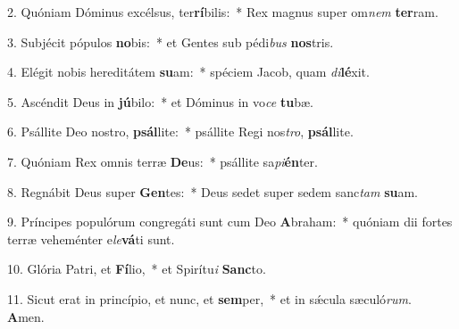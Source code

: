 2. Quóniam Dóminus excélsus, ter\textbf{rí}bilis:~*  Rex magnus super om\textit{nem} \textbf{ter}ram.\

3. Subjécit pópulos \textbf{no}bis:~*  et Gentes sub pédi\textit{bus} \textbf{nos}tris.\

4. Elégit nobis hereditátem \textbf{su}am:~*  spéciem Jacob, quam \textit{di}\textbf{lé}xit.\

5. Ascéndit Deus in \textbf{jú}bilo:~*  et Dóminus in vo\textit{ce} \textbf{tu}bæ.\

6. Psállite Deo nostro, \textbf{psál}lite:~*  psállite Regi nos\textit{tro}, \textbf{psál}lite.\

7. Quóniam Rex omnis terræ \textbf{De}us:~*  psállite sa\textit{pi}\textbf{én}ter.\

8. Regnábit Deus super \textbf{Gen}tes:~*  Deus sedet super sedem sanc\textit{tam} \textbf{su}am.\

9. Príncipes populórum congregáti sunt cum Deo \textbf{A}braham:~*  quóniam dii fortes terræ veheménter e\textit{le}\textbf{vá}ti sunt.\

10. Glória Patri, et \textbf{Fí}lio,~*  et Spirítu\textit{i} \textbf{Sanc}to.\

11. Sicut erat in princípio, et nunc, et \textbf{sem}per,~*  et in sǽcula sæculó\textit{rum}. \textbf{A}men.\

